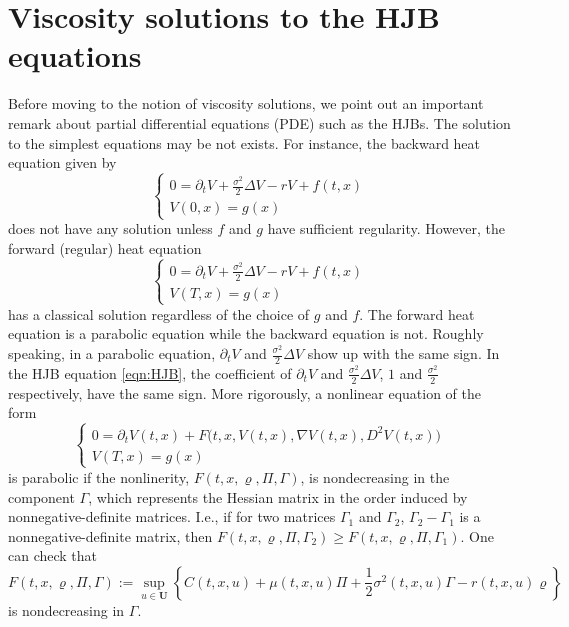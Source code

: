 \documentclass[11pt]{book}
\begin{document}
\section{Viscosity solutions to the HJB equations}
Before moving to the notion of viscosity solutions, we point out an important remark about partial differential equations (PDE) such as the HJBs. The solution to the simplest equations may be not exists. For instance, the backward heat equation given by
\begin{equation}
\begin{cases}
0=\partial_t V+\frac{\sigma^2}{2}\Delta V-rV+f(t,x)\\
V(0,x)=g(x)
\end{cases}
\end{equation}
does not have any solution unless $f$ and $g$ have sufficient regularity. However, the forward (regular) heat equation
\begin{equation}
\begin{cases}
0=\partial_t V+\frac{\sigma^2}{2}\Delta V-rV+f(t,x)\\
V(T,x)=g(x)
\end{cases}
\end{equation}
has a classical solution regardless of the choice of $g$ and $f$. The forward heat equation is a parabolic equation while the backward equation is not. Roughly speaking, in a parabolic equation, $\partial_t V$ and $\frac{\sigma^2}{2}\Delta V$ show up with the same sign. In the HJB equation \eqref{eqn:HJB}, the coefficient of $\partial_t V$ and $\frac{\sigma^2}{2}\Delta V$, $1$ and $\frac{\sigma^2}{2}$ respectively, have the same sign. More rigorously, a nonlinear equation of the form 
\begin{equation}\label{eqn:nonlinear_parabolic}
\begin{cases}
		0=\partial_{t}V(t,x)+F\big(t,x,V(t,x),\nabla V(t,x),D^2V(t,x)\big)\\
		V(T,x)=g(x)
\end{cases}
\end{equation}
is parabolic if the nonlinerity, $F(t,x,\varrho,\Pi,\Gamma)$, is nondecreasing in the component $\Gamma$, which represents the Hessian matrix in the order induced by nonnegative-definite matrices. I.e., if for two matrices $\Gamma_1$ and $\Gamma_2$, $\Gamma_2-\Gamma_1$ is a nonnegative-definite matrix, then $F(t,x,\varrho,\Pi,\Gamma_2)\ge F(t,x,\varrho,\Pi,\Gamma_1)$.
One can check that 
\begin{equation}
F(t,x,\varrho,\Pi,\Gamma):=\sup_{u\in \mathbf{U}}\left\{C(t,x,u)+\mu(t,x,u)\Pi+\frac12{\sigma^2(t,x,u)}\Gamma -r(t,x,u)\varrho\right\}
\end{equation}
is nondecreasing in $\Gamma$.
\end{document}
